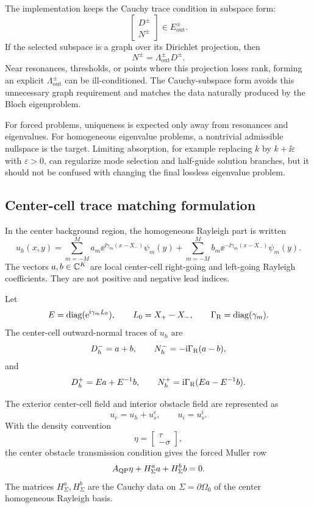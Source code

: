 The implementation keeps the Cauchy trace condition in subspace form:
\[
  \begin{bmatrix}
  D^\pm\\
  N^\pm
  \end{bmatrix}
  \in
  E_{\mathrm{out}}^\pm .
\]
If the selected subspace is a graph over its Dirichlet projection, then
\[
  N^\pm=\Lambda_{\mathrm{out}}^\pm D^\pm .
\]
Near resonances, thresholds, or points where this projection loses rank, forming
an explicit \(\Lambda_{\mathrm{out}}^\pm\) can be ill-conditioned.  The
Cauchy-subspace form avoids this unnecessary graph requirement and matches the
data naturally produced by the Bloch eigenproblem.

For forced problems, uniqueness is expected only away from resonances and
eigenvalues.  For homogeneous eigenvalue problems, a nontrivial admissible
nullspace is the target.  Limiting absorption, for example replacing \(k\) by
\(k+\ii\varepsilon\) with \(\varepsilon>0\), can regularize mode selection and
half-guide solution branches, but it should not be confused with changing the
final lossless eigenvalue problem.

\subsection{Center-cell trace matching formulation}

In the center background region, the homogeneous Rayleigh part is written
\[
  u_h(x,y)
  =
  \sum_{m=-M}^{M}
  a_m\ee^{\ii\gamma_m(x-X_-)}\psi_m(y)
  +
  \sum_{m=-M}^{M}
  b_m\ee^{-\ii\gamma_m(x-X_-)}\psi_m(y).
\]
The vectors \(a,b\in\mathbb C^K\) are local center-cell right-going and left-going
Rayleigh coefficients.  They are not positive and negative lead indices.

Let
\[
  E=\operatorname{diag}(\mathrm{e}^{\mathrm{i}\gamma_mL_0}),
  \qquad
  L_0=X_+-X_-,
  \qquad
  \Gamma_{\mathrm R}=\operatorname{diag}(\gamma_m).
\]
The center-cell outward-normal traces of \(u_h\) are
\[
  D_h^- = a+b,
  \qquad
  N_h^- = -\mathrm{i}\Gamma_{\mathrm R}(a-b),
\]
and
\[
  D_h^+ = Ea+E^{-1}b,
  \qquad
  N_h^+ = \mathrm{i}\Gamma_{\mathrm R}(Ea-E^{-1}b).
\]

The exterior center-cell field and interior obstacle field are represented as
\[
  u_e=u_h+u_s^e,
  \qquad
  u_i=u_s^i .
\]
With the density convention
\[
  \eta=
  \begin{bmatrix}
  \tau\\
  -\sigma
  \end{bmatrix},
\]
the center obstacle transmission condition gives the forced Muller row
\[
  A_{\mathrm{QP}}\eta+H_\Sigma^a a+H_\Sigma^b b=0 .
\]
The matrices \(H_\Sigma^a,H_\Sigma^b\) are the Cauchy data on
\(\Sigma=\partial\Omega_0\) of the center homogeneous Rayleigh basis.

